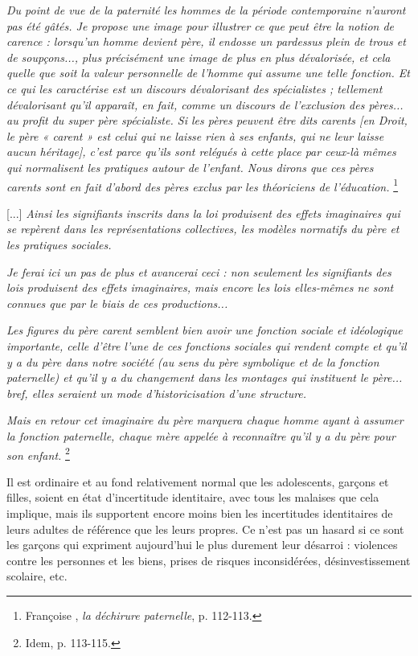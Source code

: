 \begin{displayquote} 
\emph{Du point de vue de la paternité les hommes de la période contemporaine n'auront pas été gâtés. Je propose une image pour illustrer ce que peut être la notion de carence : lorsqu'un homme devient père, il endosse un pardessus plein de trous et de soupçons..., plus précisément une image de plus en plus dévalorisée, et cela quelle que soit la valeur personnelle de l'homme qui assume une telle fonction. Et ce qui les caractérise est un discours dévalorisant des spécialistes ; tellement dévalorisant qu'il apparaît, en fait, comme un discours de l'exclusion des pères... au profit du super père spécialiste. Si les pères peuvent être dits carents \emph{[en Droit, le père « carent » est celui qui ne laisse rien à ses enfants, qui ne leur laisse aucun héritage]}, c'est parce qu'ils sont relégués à cette place par ceux-là mêmes qui normalisent les pratiques autour de l'enfant. Nous dirons que ces pères carents sont en fait d'abord des pères exclus par les théoriciens de l'éducation.}%
\footnote{Françoise , \emph{la déchirure paternelle}, p. 112-113.} 

[...] \emph{Ainsi les signifiants inscrits dans la loi produisent des effets imaginaires qui se repèrent dans les représentations collectives, les modèles normatifs du père et les pratiques sociales.} 

\emph{Je ferai ici un pas de plus et avancerai ceci : non seulement les signifiants des lois produisent des effets imaginaires, mais encore les lois elles-mêmes ne sont connues que par le biais de ces productions...}

\emph{Les figures du père carent semblent bien avoir une fonction sociale et idéologique importante, celle d'être l'une de ces fonctions sociales qui rendent compte et qu'il y a du père dans notre société (au sens du père symbolique et de la fonction paternelle) et qu'il y a du changement dans les montages qui instituent le père... bref, elles seraient un mode d'historicisation d'une structure.}

\emph{Mais en retour cet imaginaire du père marquera chaque homme ayant à assumer la fonction paternelle, chaque mère appelée à reconnaître qu'il y a du père pour son enfant.}%
\footnote{Idem, p. 113-115.}
\end{displayquote}

 Il est ordinaire et au fond relativement normal que les adolescents, garçons et filles, soient en état d'incertitude identitaire, avec tous les malaises que cela implique, mais ils supportent encore moins bien les incertitudes identitaires de leurs adultes de référence que les leurs propres. Ce n'est pas un hasard si ce sont les garçons qui expriment aujourd'hui le plus durement leur désarroi : violences contre les personnes et les biens, prises de risques inconsidérées, désinvestissement scolaire, etc. 
 

